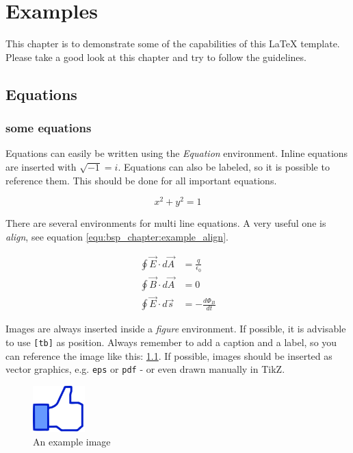 
\chapter{Examples}

This chapter is to demonstrate some of the capabilities of this \LaTeX{} template.
Please take a good look at this chapter and try to follow the guidelines.

\section{Equations}
\subsection{some equations}
%
\glspl{Equation} can easily be written using the \emph{\gls{Equation}}
environment. Inline equations are inserted with $\sqrt{-1} = i $. Equations can
also be labeled, so it is possible to reference them. This should be done for
all important equations.

\begin{equation}
    x^2 + y^2 = 1
    \label{equ:bsp_chapter:example_equation}
\end{equation}

There are several environments for multi line equations. A very useful one
is \emph{align}, see equation \ref{equ:bsp_chapter:example_align}.

\begin{align}
    \oint \vec{E} \cdot d \vec{A} &= \frac{q}{\epsilon_0} \\
    \oint \vec{B} \cdot d \vec{A} &= 0 \\
    \oint \vec{E} \cdot d \vec{s} &= - \frac{d \Phi_B}{dt}
    \label{equ:bsp_chapter:example_align}
\end{align}

%
Images are always inserted inside a \emph{figure}
environment. If possible, it is advisable to use \texttt{[tb]} as position.
Always remember to add a caption and a label, so you can reference the image
like this: \ref{fig:bsp_chapter:example_figure}. If possible, images should be
inserted as vector graphics, e.g. \texttt{eps} or \texttt{pdf} - or even drawn
manually in TikZ.

\begin{figure}[t]
    \centering
    \includegraphics[width=2cm]{chapters/bsp_chapter/images/thumbs_up.jpg}
    \caption{An example image}
    \label{fig:bsp_chapter:example_figure}
\end{figure}


